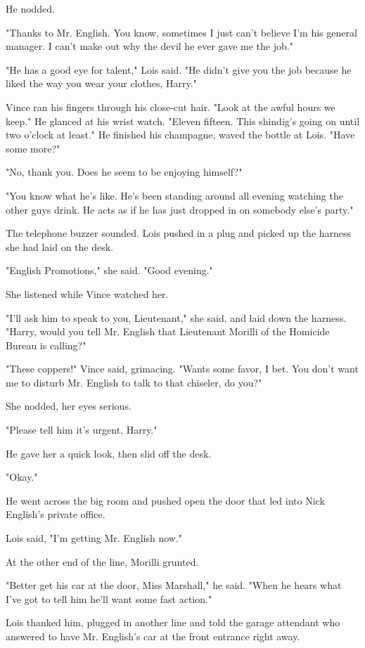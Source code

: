 \documentclass{novel}
\begin{document}
He nodded.

"Thanks to Mr. English. You know, sometimes I just can't believe I'm his general manager. I can't make out why the devil he ever gave me the job."

"He has a good eye for talent," Lois said. "He didn't give you the job because he liked the way you wear your clothes, Harry."

Vince ran his fingers through his close-cut hair. "Look at the awful hours we keep." He glanced at his wrist watch. "Eleven fifteen. This shindig's going on until two o'clock at least." He finished his champagne, waved the bottle at Lois. "Have some more?"

"No, thank you. Does he seem to be enjoying himself?"

"You know what he's like. He's been standing around all evening watching the other guys drink. He acts as if he has just dropped in on somebody else's party."

The telephone buzzer sounded. Lois pushed in a plug and picked up the harness she had laid on the desk.

"English Promotions," she said. "Good evening."

She listened while Vince watched her.

"I'll ask him to speak to you, Lieutenant," she said, and laid down the harness. "Harry, would you tell Mr. English that Lieutenant Morilli of the Homicide Bureau is calling?"

"These coppers!" Vince said, grimacing. "Wants some favor, I bet. You don't want me to disturb Mr. English to talk to that chiseler, do you?"

She nodded, her eyes serious.

"Please tell him it's urgent, Harry."

He gave her a quick look, then slid off the desk.

"Okay."

He went across the big room and pushed open the door that led into Nick English's private office.

Lois said, "I'm getting Mr. English now."

At the other end of the line, Morilli grunted.

"Better get his car at the door, Miss Marshall," he said. "When he hears what I've got to tell him he'll want some fast action."

Lois thanked him, plugged in another line and told the garage attendant who answered to have Mr. English's car at the front entrance right away.
\end{document}
